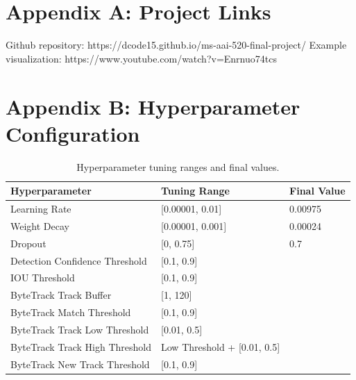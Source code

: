 \documentclass[12pt,stu,donotrepeattitle,floatsintext]{apa7}
\begin{document}
    \begin{appendices}
        \section{Appendix A: Project Links}\label{sec:project-links}
        \noindent Github repository: https://dcode15.github.io/ms-aai-520-final-project/
        \noindent Example visualization: https://www.youtube.com/watch?v=Enrnuo74tcs

        \section{Appendix B: Hyperparameter Configuration}\label{sec:hyperparameters}

        \begin{table}[tb]
        \centering
        \renewcommand{\arraystretch}{0.8}
        \begin{tabular}{|l|l|l|}
            \hline
                \textbf{Hyperparameter} & \textbf{Tuning Range} & \textbf{Final Value} \\ \hline
                Learning Rate & [0.00001, 0.01] & 0.00975 \\ \hline
                Weight Decay & [0.00001, 0.001] & 0.00024 \\ \hline
                Dropout & [0, 0.75] & 0.7 \\ \hline
                Detection Confidence Threshold & [0.1, 0.9] & \\ \hline
                IOU Threshold & [0.1, 0.9] & \\ \hline
                ByteTrack Track Buffer & [1, 120] & \\ \hline
                ByteTrack Match Threshold & [0.1, 0.9] & \\ \hline
                ByteTrack Track Low Threshold & [0.01, 0.5] & \\ \hline
                ByteTrack Track High Threshold & Low Threshold + [0.01, 0.5] & \\ \hline
                ByteTrack New Track Threshold & [0.1, 0.9] & \\ \hline
            \end{tabular}
            \\[10pt]
            \caption{Hyperparameter tuning ranges and final values.}
            \label{tab:hyperparameters}
        \end{table}

    \end{appendices}
\end{document}
